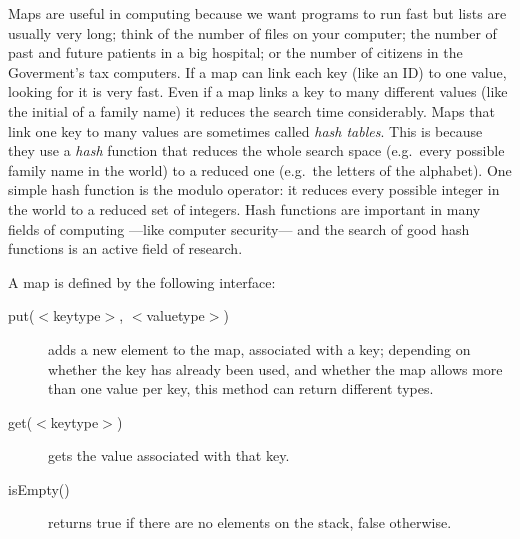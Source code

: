 Maps are useful in computing because we want programs to run fast but
lists are usually very long; think of the number of files on your
computer; the number of past and future patients in a big hospital; or
the number of citizens in the Goverment's tax computers. If a map can
link each key (like an ID) to one value, looking for it is very
fast. Even if a map links a key to many different values (like the
initial of a family name) it reduces the search time
considerably. Maps that link one key to many values are sometimes
called \emph{hash tables}. This is because they use a \emph{hash}
function that reduces the whole search space (e.g.~every possible
family name in the world) to a reduced one (e.g.~the letters of the
alphabet). One simple hash function is the modulo operator: it reduces
every possible integer in the world to a reduced set of integers. Hash
functions are important in many fields of computing ---like computer
security--- and the search of good hash functions is an active field of
research. 

A map is defined by the following interface: 

\begin{description}
\item[put($<$keytype$>$, $<$valuetype$>$)] adds a new element to the
  map, associated with a key; depending on whether the key has already
  been used, and whether the map allows more than one value per key,
  this method can return different types. 
\item[get($<$keytype$>$) ] gets the value associated with that key.
\item[isEmpty() ] returns true if there are no elements on the stack,
  false otherwise.
\end{description}






